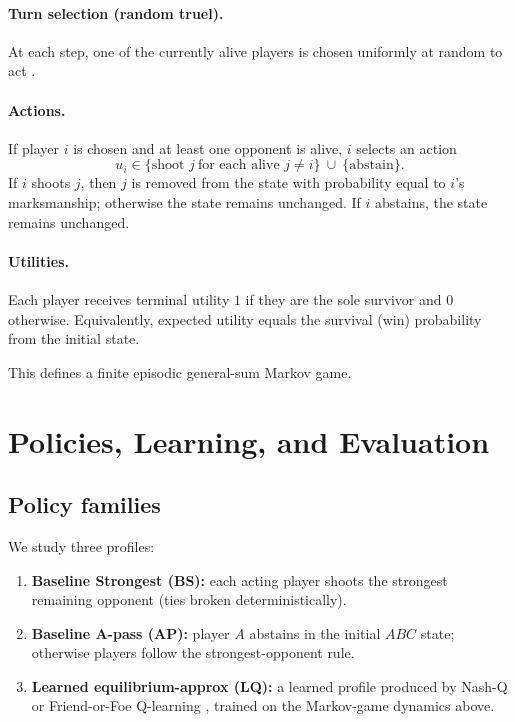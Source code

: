 \documentclass[11pt]{article}
\begin{document}
\paragraph{Turn selection (random truel).}
At each step, one of the currently alive players is chosen uniformly at random to act \citep{AmengualToral2006}.

\paragraph{Actions.}
If player $i$ is chosen and at least one opponent is alive, $i$ selects an action
\[
u_i \in \{\text{shoot }j \ \text{for each alive } j\neq i\}\ \cup\ \{\text{abstain}\}.
\]
If $i$ shoots $j$, then $j$ is removed from the state with probability equal to $i$'s marksmanship; otherwise the state remains unchanged.
If $i$ abstains, the state remains unchanged.

\paragraph{Utilities.}
Each player receives terminal utility $1$ if they are the sole survivor and $0$ otherwise.
Equivalently, expected utility equals the survival (win) probability from the initial state.

This defines a finite episodic general-sum Markov game.

\section{Policies, Learning, and Evaluation}

\subsection{Policy families}
We study three profiles:
\begin{enumerate}
  \item \textbf{Baseline Strongest (BS):} each acting player shoots the strongest remaining opponent (ties broken deterministically).
  \item \textbf{Baseline A-pass (AP):} player $A$ abstains in the initial $ABC$ state; otherwise players follow the strongest-opponent rule.
  \item \textbf{Learned equilibrium-approx (LQ):} a learned profile produced by Nash-Q \citep{HuWellman2003} or Friend-or-Foe Q-learning \citep{Littman2001}, trained on the Markov-game dynamics above.
\end{enumerate}
\end{document}
